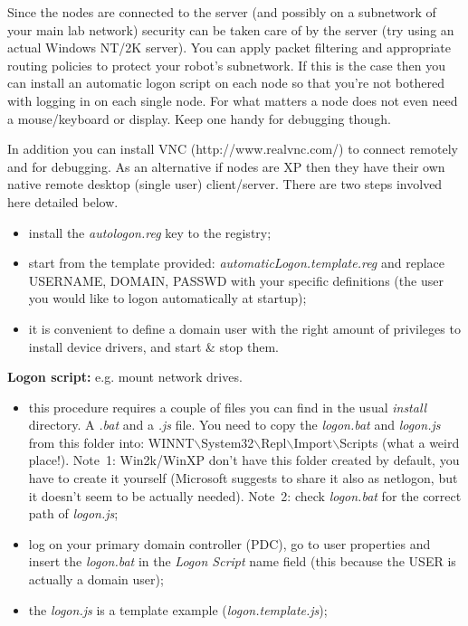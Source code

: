  Since the nodes are connected to the server (and possibly on a subnetwork of your main lab network) security can be taken care of by the server (try using an actual Windows NT/2K server). You can apply packet filtering and appropriate routing policies to protect your robot's subnetwork. If this is the case then you can install an automatic logon script on each node so that you're not bothered with logging in on each single node. For what matters a node does not even need a mouse/keyboard or display. Keep one handy for debugging though.

In addition you can install VNC (http://www.realvnc.com/) to connect remotely and for debugging. As an alternative if nodes are XP then they have their own native remote desktop (single user) client/server. There are two steps involved here detailed below.

\begin{itemize}
\item install the {\em autologon.reg} key to the registry;
\item start from the template provided: {\em automaticLogon.template.reg} and replace USERNAME, DOMAIN, PASSWD with your specific definitions (the user you would like to logon automatically at startup);
\item it is convenient to define a domain user with the right amount of privileges to install device drivers, and start \& stop them.
\end{itemize}

{\bf Logon script:} e.g. mount network drives.
\begin{itemize}
\item this procedure requires a couple of files you can find in the usual {\em install} directory. A {\em .bat} and a {\em .js} file. You need to copy the {\em logon.bat} and {\em logon.js} from this folder into: WINNT$\backslash$System32$\backslash$Repl$\backslash$Import$\backslash$Scripts (what a weird place!). Note~1: Win2k/WinXP don't have this folder created by default, you have to create it yourself (Microsoft suggests to share it also as netlogon, but it doesn't seem to be actually needed). Note~2: check {\em logon.bat} for the correct path of {\em logon.js};
\item log on your primary domain controller (PDC), go to user properties and insert the {\em logon.bat} in the {\em Logon Script} name field (this because the USER is actually a domain user);
\item the {\em logon.js} is a template example ({\em logon.template.js});
\end{itemize}

